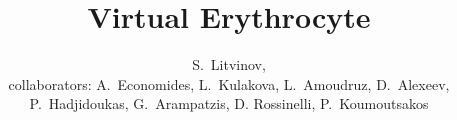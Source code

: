 \author[Litvinov]
{S.~Litvinov, \\ collaborators: A.~Economides, L.~Kulakova,
L.~Amoudruz, D.~Alexeev, P.~Hadjidoukas, G.~Arampatzis, D. Rossinelli,
P.~Koumoutsakos}
\title{Virtual Erythrocyte}
\date{}
